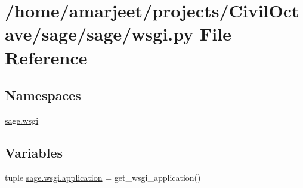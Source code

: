 \hypertarget{a00023}{}\section{/home/amarjeet/projects/\+Civil\+Octave/sage/sage/wsgi.py File Reference}
\label{a00023}
\subsection*{Namespaces}
\begin{DoxyCompactItemize}
\item 
 \hyperlink{a00045}{sage.\+wsgi}
\end{DoxyCompactItemize}
\subsection*{Variables}
\begin{DoxyCompactItemize}
\item 
tuple \hyperlink{a00045_a1ddb23bace7377dbda42c61a804bb9aa}{sage.\+wsgi.\+application} = get\+\_\+wsgi\+\_\+application()
\end{DoxyCompactItemize}
